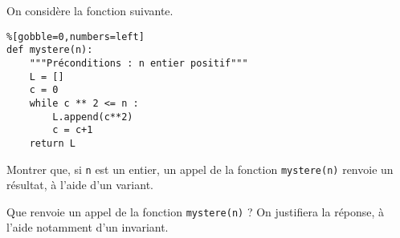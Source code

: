\exer{}
\setcounter{numques}{0}

On considère la fonction suivante.
\begin{lstlisting}%[gobble=0,numbers=left]
def mystere(n):
    """Préconditions : n entier positif"""
    L = []
    c = 0 
    while c ** 2 <= n : 
        L.append(c**2)
        c = c+1
    return L
\end{lstlisting}

\bigskip{}

\question{} Montrer que, si \texttt{n} est un entier, un  appel de la fonction \texttt{mystere(n)} renvoie un résultat, à l'aide d'un variant. 

\medskip{}

\question{} Que renvoie un appel de la fonction \texttt{mystere(n)} ? On justifiera la réponse, à l'aide notamment d'un invariant. 